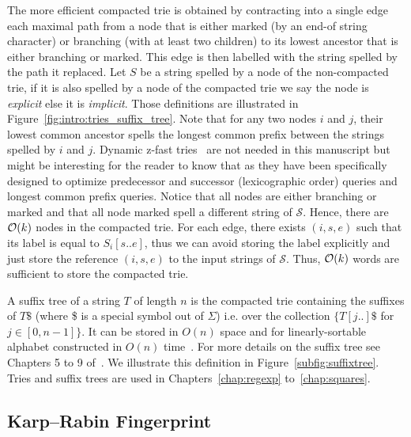 The more efficient compacted trie is obtained by contracting  into a single edge each maximal path from a node that is either marked (by an end-of string character) or branching (with at least two children) to its lowest ancestor that is either branching or marked.
This edge is then labelled with the string spelled by the path it replaced.
Let $S$ be a string spelled by a node of the non-compacted trie, if it is also spelled by a node of the compacted trie we say the node is \emph{explicit} else it is \emph{implicit}. Those definitions are illustrated in Figure~\ref{fig:intro:tries_suffix_tree}. Note that for any two nodes $i$ and $j$, their lowest common ancestor spells the longest common prefix between the strings spelled by $i$ and $j$.
Dynamic z-fast tries~\cite{belazzougui2010dynamic} are not needed in this manuscript but might be interesting for the reader to know that as they have been specifically designed to optimize predecessor and successor (lexicographic order) queries and longest common prefix queries.
%
Notice that all nodes are either branching or marked and that all node marked spell a different string of $\mathcal{S}$. 
Hence, there are $\mathcal{O}(k)$ nodes in the compacted trie.
For each edge, there exists $(i,s,e)$ such that its label is equal to $S_i[s .. e]$, thus we can avoid storing the label explicitly and just store the reference $(i,s,e)$ to the input strings of $\mathcal{S}$.
Thus, $\mathcal{O}(k)$ words are sufficient to store the compacted trie.

A suffix tree of a string $T$ of length $n$ is the compacted trie containing the suffixes of $T\$$ (where \$ is a special symbol out of $\Sigma$) i.e. over the collection $\{T[j..]\$$ for $ j \in [0,n-1] \}$. It can be stored in $O(n)$ space and for linearly-sortable alphabet constructed in $O(n)$ time~\cite{Farach1997}. For more details on the suffix tree see Chapters 5 to 9 of~\cite{Gusfield1997}. We illustrate this definition in Figure~\ref{subfig:suffixtree}. Tries and suffix trees are used in Chapters~\ref{chap:regexp} to~\ref{chap:squares}.



\subsection{Karp--Rabin Fingerprint}\label{sec:prelim:KR}

